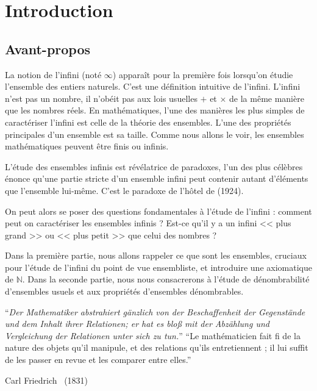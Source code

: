 \documentclass[a4paper,french,final]{memoir}
\begin{document}
\begin{titlingpage}

\end{titlingpage}
\frontmatter
\tableofcontents
\part{Introduction}

\chapter{Avant-propos}

La notion de l'infini (noté $\infty$) apparaît pour la première fois lorsqu'on étudie l'ensemble des entiers naturels. C'est une définition intuitive de l'infini. L'infini n'est pas un nombre, il n'obéit pas aux lois usuelles $+$ et $\times$ de la même manière que les nombres réels. En mathématiques, l'une des manières les plus simples de caractériser l'infini est celle de la théorie des ensembles. L'une des propriétés principales d'un ensemble est sa taille. Comme nous allons le voir, les ensembles mathématiques peuvent être finis ou infinis.

L'étude des ensembles infinis est révélatrice de paradoxes, l'un des plus célèbres  énonce qu'une partie stricte d'un ensemble infini peut contenir autant d'éléments que l'ensemble lui-même. C'est le paradoxe de l'hôtel de  (1924).

On peut alors se poser des questions fondamentales à l'étude de l'infini : comment peut on caractériser les ensembles infinis ? Est-ce qu'il y a un infini << plus grand >> ou << plus petit >> que celui des nombres ?  

Dans la première partie, nous allons rappeler ce que sont les ensembles, cruciaux pour l'étude de l'infini du point de vue ensembliste, et introduire une axiomatique de $\mathbb{N}$. 
Dans la seconde partie, nous nous consacrerons à l'étude de dénombrabilité d'ensembles usuels et aux propriétés d'ensembles dénombrables.

\epigraph{%
	\enquote{\itshape Der Mathematiker abstrahiert gänzlich von der Beschaffenheit der Gegenstände und dem Inhalt ihrer Relationen; er hat es bloß mit der Abzählung und Vergleichung der Relationen unter sich zu tun.}\newline \newline
\enquote{Le mathématicien fait fi de la nature des objets qu'il manipule, et des relations qu'ils entretiennent ; il lui suffit de les passer en revue et  les comparer entre elles.}
}{Carl Friedrich \footnotemark~(1831)}
\end{document}

